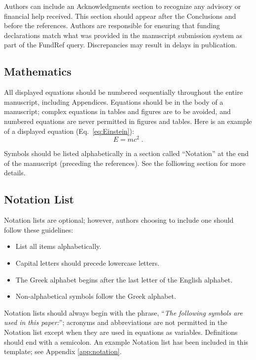 \documentclass[Journal,letterpaper]{ascelike-new}
\begin{document}
Authors can include an Acknowledgments section to recognize any advisory or financial help received. This section should appear after the Conclusions and before the references. Authors are responsible for ensuring that funding declarations match what was provided in the manuscript submission system as part of the FundRef query. Discrepancies may result in delays in publication.

\subsection{Mathematics}

All displayed equations should be numbered sequentially throughout the entire manuscript, including Appendices. Equations should be in the body of a manuscript; complex equations in tables and figures are to be avoided, and numbered equations are never permitted in figures and tables. Here is an example of a displayed equation (Eq.~\ref{eq:Einstein}):
\begin{equation} \label{eq:Einstein}
E = m c^{2} \;.
\end{equation}

Symbols should be listed alphabetically in a section called ``Notation'' at the end of the manuscript (preceding the references). See the folliowing section for more details.

\subsection{Notation List}

Notation lists are optional; however, authors choosing to include one should follow these guidelines:

\begin{itemize}
\item List all items alphabetically.
\item Capital letters should precede lowercase letters.
\item The Greek alphabet begins after the last letter of the English alphabet.
\item Non-alphabetical symbols follow the Greek alphabet.
\end{itemize}

Notation lists should always begin with the phrase, ``\textit{The following symbols are used in this paper:}''; acronyms and abbreviations are not permitted in the Notation list except when they are used in equations as variables. Definitions should end with a semicolon. An example Notation list has been included in this template; see Appendix \ref{app:notation}.
\end{document}

